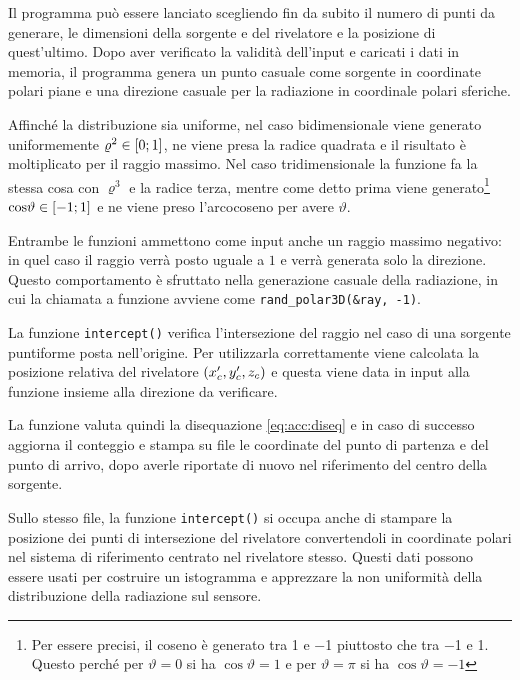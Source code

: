         Il programma può essere lanciato scegliendo fin da subito il numero di punti da generare, le dimensioni della sorgente e del rivelatore e la posizione di quest'ultimo. Dopo aver verificato la validità dell'input e caricati i dati in memoria, il programma genera un punto casuale come sorgente in coordinate polari piane e una direzione casuale per la radiazione in coordinale polari sferiche.
        
        Affinché la distribuzione sia uniforme, nel caso bidimensionale viene generato uniformemente $\varrho^2 \in \bqty{0;1}$, ne viene presa la radice quadrata e il risultato è moltiplicato per il raggio massimo. Nel caso tridimensionale la funzione fa la stessa cosa con $\varrho^3$ e la radice terza, mentre come detto prima viene generato\footnote{Per essere precisi, il coseno è generato tra \num{1} e \num{-1} piuttosto che tra \num{-1} e \num{1}. Questo perché per $\vartheta = 0$ si ha $\cos\!\vartheta = \num{1}$ e per $\vartheta = \pi$ si ha $\cos\!\vartheta = \num{-1}$} $\cos\!\vartheta \in \bqty{-1;1}$ e ne viene preso l'arcocoseno per avere $\vartheta$.

        Entrambe le funzioni ammettono come input anche un raggio massimo negativo: in quel caso il raggio verrà posto uguale a $1$ e verrà generata solo la direzione. Questo comportamento è sfruttato nella generazione casuale della radiazione, in cui la chiamata a funzione avviene come \verb|rand_polar3D(&ray, -1)|.
        
        La funzione \verb|intercept()| verifica l'intersezione del raggio nel caso di una sorgente puntiforme posta nell'origine. Per utilizzarla correttamente viene calcolata la posizione relativa del rivelatore $\pqty{x_c', y_c', z_c}$ e questa viene data in input alla funzione insieme alla direzione da verificare.
        
        La funzione valuta quindi la disequazione \eqref{eq:acc:diseq} e in caso di successo aggiorna il conteggio e stampa su file le coordinate del punto di partenza e del punto di arrivo, dopo averle riportate di nuovo nel riferimento del centro della sorgente.

        Sullo stesso file, la funzione \verb|intercept()| si occupa anche di stampare la posizione dei punti di intersezione del rivelatore convertendoli in coordinate polari nel sistema di riferimento centrato nel rivelatore stesso. Questi dati possono essere usati per costruire un istogramma e apprezzare la non uniformità della distribuzione della radiazione sul sensore.

